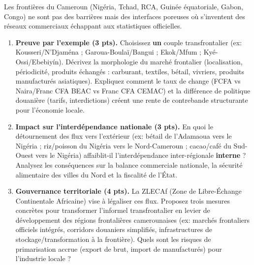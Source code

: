 \documentclass[11pt]{article}
\begin{document}
\begin{exercice}
Les frontières du Cameroun (Nigéria, Tchad, RCA, Guinée équatoriale, Gabon, Congo) ne sont pas des barrières mais des interfaces poreuses où s'inventent des réseaux commerciaux échappant aux statistiques officielles.

\begin{enumerate}
    \item \textbf{Preuve par l'exemple (3 pts).} Choisissez \textbf{un} couple transfrontalier (ex: Kousseri/N'Djaména ; Garoua-Boulaï/Bangui ; Ekok/Mfum ; Kyé-Ossi/Ebebiyín). Décrivez la morphologie du marché frontalier (localisation, périodicité, produits échangés : carburant, textiles, bétail, vivriers, produits manufacturés asiatiques). Expliquez comment le taux de change (FCFA vs Naira/Franc CFA BEAC vs Franc CFA CEMAC) et la différence de politique douanière (tarifs, interdictions) créent une rente de contrebande structurante pour l'économie locale.
    \item \textbf{Impact sur l'interdépendance nationale (3 pts).} En quoi le détournement des flux vers l'extérieur (ex: bétail de l'Adamaoua vers le Nigéria ; riz/poisson du Nigéria vers le Nord-Cameroun ; cacao/café du Sud-Ouest vers le Nigéria) affaiblit-il l'interdépendance inter-régionale \textbf{interne} ? Analysez les conséquences sur la balance commerciale nationale, la sécurité alimentaire des villes du Nord et la fiscalité de l'État.
    \item \textbf{Gouvernance territoriale (4 pts).} La ZLECAf (Zone de Libre-Échange Continentale Africaine) vise à légaliser ces flux. Proposez trois mesures concrètes pour transformer l'informel transfrontalier en levier de développement des régions frontalières camerounaises (ex: marchés frontaliers officiels intégrés, corridors douaniers simplifiés, infrastructures de stockage/transformation à la frontière). Quels sont les risques de \og primarisation \fg accrue (export de brut, import de manufacturés) pour l'industrie locale ?
\end{enumerate}
\end{exercice}
\end{document}
